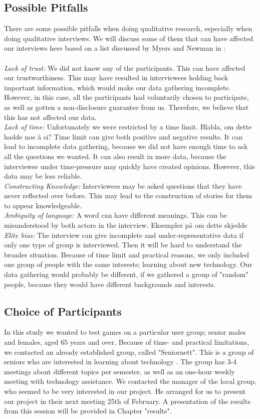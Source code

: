 \subsection{Possible Pitfalls}
There are some possible pitfalls when doing qualitative research, especially when doing qualitative interviews. We will discuss some of them that can have affected our interviews here based on a list discussed by Myers and Newman in \cite{interview}: \\ \\
\emph{Lack of trust:} We did not know any of the participants. This can have affected our trustworthiness. This may have resulted in interviewees holding back important information, which would make our data gathering incomplete. However, in this case, all the participants had voluntarily chosen to participate, as well as gotten a non-disclosure guarantee from us. Therefore, we believe that this has not affected our data.\\
\emph{Lack of time:} Unfortunately we were restricted by a time limit. Blabla, om dette hadde noe å si? Time limit can give both positive and negative results. It can lead to incomplete data gathering, because we did not have enough time to ask all the questions we wanted. It can also result in more data, because the interviewee under time-pressure  may quickly have created opinions. However, this data may be less reliable. \\
\emph{Constructing Knowledge:} Interviewees may be asked questions that they have never reflected over before. This may lead to the construction of stories for them to appear knowledgeable. \\
\emph{Ambiguity of language:} A word can have different meanings. This can be misunderstood by both actors in the interview. Eksempler på om dette skjedde \\
\emph{Elite bias:} The interview can give incomplete and under-representative data if only one type of group is interviewed. Then it will be hard to understand the broader situation. Because of time limit and practical reasons, we only included one group of people with the same interests; learning about new technology. Our data gathering would probably be different, if we gathered a group of "random" people, because they would have different backgrounds and interests. 

\subsection{Choice of Participants}
In this study we wanted to test games on a particular user group; senior males and females, aged 65 years and over. Because of time- and practical limitations, we contacted an already established group, called "Seniornett". This is a group of seniors who are interested in learning about technology \cite{seniornett}. The group has 3-4 meetings about different topics per semester, as well as an one-hour weekly meeting with technology assistance. We contacted the manager of the local group, who seemed to be very interested in our project. He arranged for us to present our project in their next meeting 25th of February. A presentation of the results from this session will be provided in Chapter "results".

